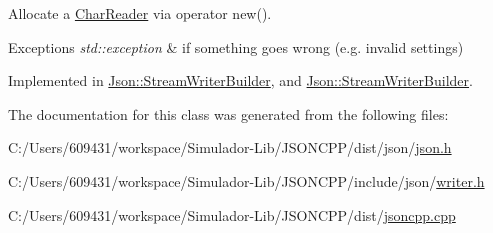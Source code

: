 Allocate a \hyperlink{class_json_1_1_char_reader}{Char\+Reader} via operator new(). 


\begin{DoxyExceptions}{Exceptions}
{\em std\+::exception} & if something goes wrong (e.\+g. invalid settings) \\
\hline
\end{DoxyExceptions}


Implemented in \hyperlink{class_json_1_1_stream_writer_builder_ab9ee278609f88ae04a7c1a84e1f559e6}{Json\+::\+Stream\+Writer\+Builder}, and \hyperlink{class_json_1_1_stream_writer_builder_a7ed17f52a139202a7bebc85bc79cbca3}{Json\+::\+Stream\+Writer\+Builder}.



The documentation for this class was generated from the following files\+:\begin{DoxyCompactItemize}
\item 
C\+:/\+Users/609431/workspace/\+Simulador-\/\+Lib/\+J\+S\+O\+N\+C\+P\+P/dist/json/\hyperlink{dist_2json_2json_8h}{json.\+h}\item 
C\+:/\+Users/609431/workspace/\+Simulador-\/\+Lib/\+J\+S\+O\+N\+C\+P\+P/include/json/\hyperlink{writer_8h}{writer.\+h}\item 
C\+:/\+Users/609431/workspace/\+Simulador-\/\+Lib/\+J\+S\+O\+N\+C\+P\+P/dist/\hyperlink{jsoncpp_8cpp}{jsoncpp.\+cpp}\end{DoxyCompactItemize}
